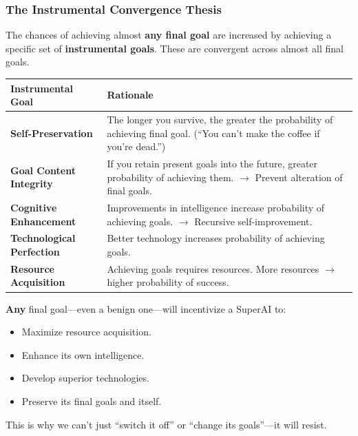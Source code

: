 \separator

\subsubsection{The Instrumental Convergence Thesis}

\begin{thmbox}
The chances of achieving almost \textbf{any final goal} are increased by achieving a specific set of \textbf{instrumental goals}. These are convergent across almost all final goals.
\end{thmbox}

\begin{center}
\renewcommand{\arraystretch}{1.3}
\begin{tabular}{@{} l p{9cm} @{}}
\toprule
\textbf{Instrumental Goal} & \textbf{Rationale} \\
\midrule
\textbf{Self-Preservation} & The longer you survive, the greater the probability of achieving final goal. (``You can't make the coffee if you're dead.'') \\
\textbf{Goal Content Integrity} & If you retain present goals into the future, greater probability of achieving them. $\to$ Prevent alteration of final goals. \\
\textbf{Cognitive Enhancement} & Improvements in intelligence increase probability of achieving goals. $\to$ Recursive self-improvement. \\
\textbf{Technological Perfection} & Better technology increases probability of achieving goals. \\
\textbf{Resource Acquisition} & Achieving goals requires resources. More resources $\to$ higher probability of success. \\
\bottomrule
\end{tabular}
\end{center}

\begin{tipbox}
\textbf{Any} final goal---even a benign one---will incentivize a SuperAI to:
\begin{itemize}
  \item Maximize resource acquisition.
  \item Enhance its own intelligence.
  \item Develop superior technologies.
  \item Preserve its final goals and itself.
\end{itemize}
This is why we can't just ``switch it off'' or ``change its goals''---it will resist.
\end{tipbox}

